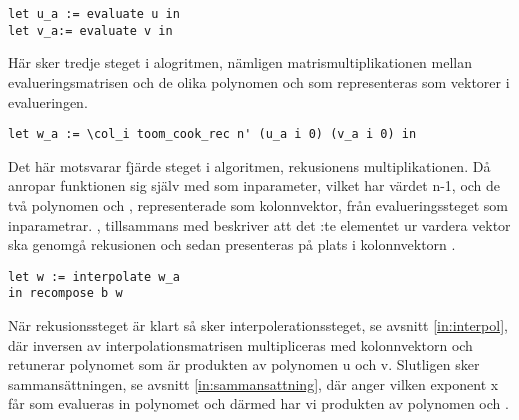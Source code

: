 \begin{lstlisting}
let u_a := evaluate u in
let v_a:= evaluate v in
\end{lstlisting}

Här sker tredje steget i alogritmen, nämligen matrismultiplikationen mellan
evalueringsmatrisen och de olika polynomen  och  som representeras
som vektorer i evalueringen.

\begin{lstlisting}
let w_a := \col_i toom_cook_rec n' (u_a i 0) (v_a i 0) in
\end{lstlisting}

Det här motsvarar fjärde steget i algoritmen, rekusionens multiplikationen. Då
anropar funktionen  sig själv med  som inparameter, vilket
har värdet n-1, och de två polynomen  och , representerade som
kolonnvektor, från evalueringssteget som inparametrar. ,  tillsammans med  beskriver att det :te elementet ur
vardera vektor ska genomgå rekusionen och sedan presenteras på plats  i
kolonnvektorn .

\begin{lstlisting}
let w := interpolate w_a
in recompose b w
\end{lstlisting}

När rekusionssteget är klart så sker interpolerationssteget, se avsnitt
\ref{in:interpol}, där inversen av interpolationsmatrisen multipliceras med
kolonnvektorn  och retunerar polynomet  som är produkten av
polynomen u och v. Slutligen sker sammansättningen, se avsnitt
\ref{in:sammansattning}, där  anger vilken exponent x får som evalueras in
polynomet  och därmed har vi produkten av polynomen  och .
